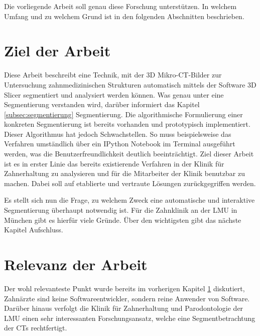 Die vorliegende Arbeit soll genau diese Forschung unterstützen. In welchem Umfang
und zu welchem Grund ist in den folgenden Abschnitten beschrieben.

\section{Ziel der Arbeit}
\label{sec:ziel_der_arbeit} Diese Arbeit beschreibt eine Technik, mit der \ac{3D}
Mikro-\ac{CT}-Bilder zur Untersuchung zahnmedizinischen Strukturen automatisch
mittels der Software 3D Slicer segmentiert und analysiert werden können. Was genau
unter eine Segmentierung verstanden wird, darüber informiert das Kapitel
\ref{subsec:segmentierung} Segmentierung. Die algorithmische Formulierung einer konkreten
Segmentierung ist bereits vorhanden und prototypisch implementiert. Dieser
Algorithmus hat jedoch Schwachstellen. So muss beispielsweise das Verfahren umständlich
über ein IPython Notebook im Terminal ausgeführt werden, was die
Benutzerfreundlichkeit deutlich beeinträchtigt. Ziel dieser Arbeit ist es in erster
Linie das bereits existierende Verfahren in der Klinik für Zahnerhaltung zu analysieren
und für die Mitarbeiter der Klinik benutzbar zu machen. Dabei soll auf
etablierte und vertraute Lösungen zurückgegriffen werden.

Es stellt sich nun die Frage, zu welchem Zweck eine automatische und interaktive
Segmentierung überhaupt notwendig ist. Für die Zahnklinik an der LMU in München
gibt es hierfür viele Gründe. Über den wichtigsten gibt das nächste Kapitel Aufschluss.

\section{Relevanz der Arbeit}
\label{sec:relevanz_der_arbeit} Der wohl relevanteste Punkt wurde bereits im vorherigen
Kapitel \ref{sec:ziel_der_arbeit} diskutiert, Zahnärzte sind keine
Softwareentwickler, sondern reine Anwender von Software. Darüber hinaus verfolgt
die Klinik für Zahnerhaltung und Parodontologie der \ac{LMU} einen sehr interessanten
Forschungsansatz, welche eine Segmentbetrachtung der \ac{CT}s rechtfertigt.

